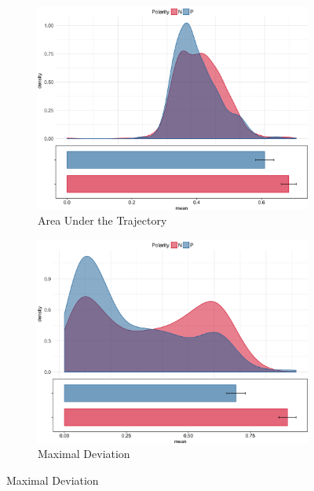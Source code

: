 \documentclass{article}
\begin{document}
\begin{figure}
\centering
\begin{subfigure}[b]{0.4\textwidth}
\includegraphics[width=\textwidth]{AUC_negation.png}
\caption{Area Under the Trajectory}
\end{subfigure}
%
\begin{subfigure}[b]{0.4\textwidth}
\includegraphics[width=\textwidth]{MD_negation.png}
\caption{Maximal Deviation}
\end{subfigure}


\end{figure}
\end{document}
